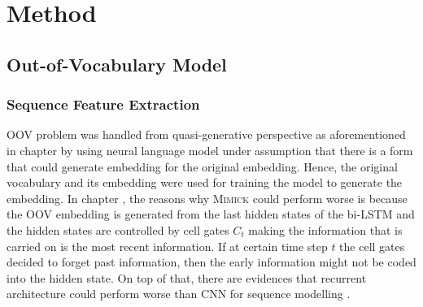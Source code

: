 \chapter{Method}
\label{chap:method}

\section{Out-of-Vocabulary Model}
    \subsection{Sequence Feature Extraction}
        OOV problem was handled from quasi-generative perspective as
        aforementioned in chapter  by using neural
        language model under assumption that there is a form that
        could generate embedding for the original embedding. Hence,
        the original vocabulary and its embedding were used for
        training the model to generate the embedding. In chapter
        , the reasons why \textsc{Mimick} could
        perform worse is because the OOV embedding is generated from
        the last hidden states of the bi-LSTM and the hidden states are
        controlled by cell gates $C_t$ making the information that is
        carried on is the most recent information. If at certain time
        step $t$ the cell gates decided to forget past information,
        then the early information might not be coded into the hidden
        state. On top of that, there are evidences that recurrent
        architecture could perform worse than CNN for sequence
        modelling \citep{empirical2018shaujie}. 
        
